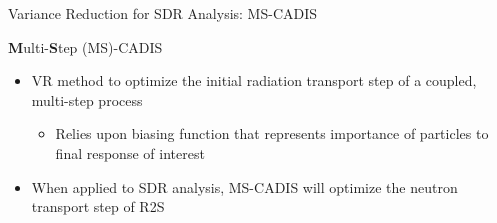 \documentclass{beamer}
\begin{document}
\begin{frame}{Variance Reduction for SDR Analysis: MS-CADIS}
	\begin{block}{\textbf{M}ulti-\textbf{S}tep (MS)-CADIS}
  \begin{itemize}
  \item {VR method to optimize the initial radiation transport step of a
	  coupled, multi-step process}
		  \begin{itemize}
			  \item{Relies upon biasing function that represents importance
				  of particles to final response of
				  interest}
		  \end{itemize}
	  
	  \item{When applied to SDR analysis, MS-CADIS will optimize the
		  neutron transport step of R2S}
\end{itemize}
\end{block}
%
\end{frame}
\end{document}
